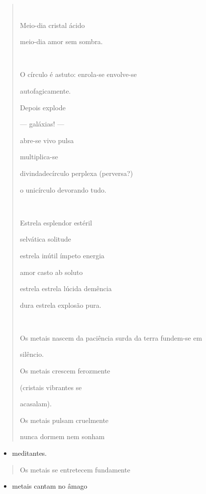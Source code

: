 \begin{quote}


Meio-dia cristal ácido

meio-dia amor sem sombra.



O círculo é astuto: enrola-se envolve-se

autofagicamente.

Depois explode

--- galáxias! ---

abre-se vivo pulsa

multiplica-se

divindadecírculo perplexa (perversa?)

o unicírculo devorando tudo.



Estrela esplendor estéril

selvática solitude

estrela inútil ímpeto energia

amor casto ab soluto

estrela estrela lúcida demência

dura estrela explosão pura.



Os metais nascem da paciência surda da terra fundem-se em

silêncio.

Os metais crescem ferozmente

(cristais vibrantes se

acasalam).

Os metais pulsam cruelmente

nunca dormem nem sonham
\end{quote}

\begin{itemize}
\item
  meditantes.
\end{itemize}

\begin{quote}
Os metais se entretecem fundamente
\end{quote}

\begin{itemize}
\item
  metais cantam no âmago
\end{itemize}

